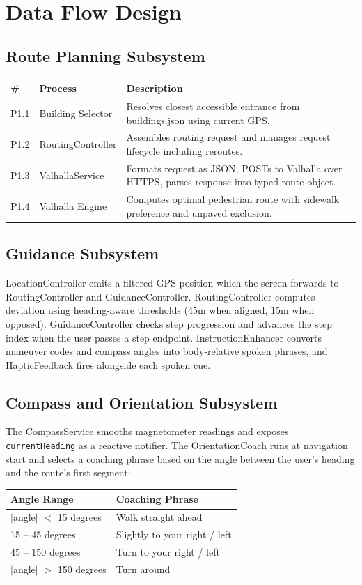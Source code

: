 \documentclass[12pt]{article}
\begin{document}
\section{Data Flow Design}

\subsection{Route Planning Subsystem}
\begin{tabularx}{\textwidth}{|l|l|X|}
\hline
\textbf{\#} & \textbf{Process} & \textbf{Description} \\
\hline
P1.1 & Building Selector & Resolves closest accessible entrance from buildings.json using current GPS. \\
\hline
P1.2 & RoutingController & Assembles routing request and manages request lifecycle including reroutes. \\
\hline
P1.3 & ValhallaService & Formats request as JSON, POSTs to Valhalla over HTTPS, parses response into typed route object. \\
\hline
P1.4 & Valhalla Engine & Computes optimal pedestrian route with sidewalk preference and unpaved exclusion. \\
\hline
\end{tabularx}

\subsection{Guidance Subsystem}
LocationController emits a filtered GPS position which the screen forwards to RoutingController and GuidanceController. RoutingController computes deviation using heading-aware thresholds (45m when aligned, 15m when opposed). GuidanceController checks step progression and advances the step index when the user passes a step endpoint. InstructionEnhancer converts maneuver codes and compass angles into body-relative spoken phrases, and HapticFeedback fires alongside each spoken cue.

\subsection{Compass and Orientation Subsystem}
The CompassService smooths magnetometer readings and exposes \texttt{currentHeading} as a reactive notifier. The OrientationCoach runs at navigation start and selects a coaching phrase based on the angle between the user's heading and the route's first segment:

\begin{tabularx}{\textwidth}{|l|X|}
\hline
\textbf{Angle Range} & \textbf{Coaching Phrase} \\
\hline
$|$angle$|$ $<$ 15 degrees & Walk straight ahead \\
\hline
15 -- 45 degrees & Slightly to your right / left \\
\hline
45 -- 150 degrees & Turn to your right / left \\
\hline
$|$angle$|$ $>$ 150 degrees & Turn around \\
\hline
\end{tabularx}
\end{document}
